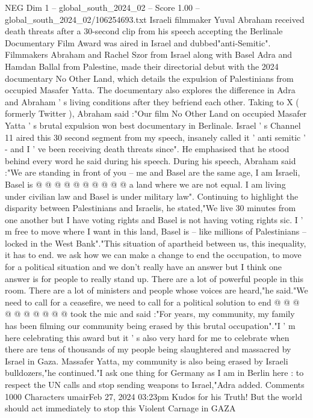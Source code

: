 \begin{textsample}{NEG Dim 1 – global\_south\_2024\_02 – Score 1.00 – global\_south\_2024\_02/106254693.txt}  \label{ex:f1_neg_255}
Israeli filmmaker Yuval Abraham received death threats after a 30-second clip from his speech accepting the Berlinale Documentary Film Award was aired in Israel and dubbed"anti-Semitic".
Filmmakers Abraham and Rachel Szor from Israel along with Basel Adra and Hamdan Ballal from Palestine, made their directorial debut with the 2024 documentary No Other Land, which details the expulsion of Palestinians from occupied Masafer Yatta.
The documentary also explores the difference in Adra and Abraham ' s living conditions after they befriend each other.
Taking to X ( formerly Twitter ), Abraham said :"Our film No Other Land on occupied Masafer Yatta ' s brutal expulsion won best documentary in Berlinale.
Israel ' s Channel 11 aired this 30 second segment from my speech, insanely called it ' anti semitic ' - and I ' ve been receiving death threats since".
He emphasised that he stood behind every word he said during his speech.
During his speech, Abraham said :"We are standing in front of you -- me and Basel are the same age, I am Israeli, Basel is @ @ @ @ @ @ @ @ @ @ a land where we are not equal.
I am living under civilian law and Basel is under military law".
Continuing to highlight the disparity between Palestinians and Israelis, he stated,"We live 30 minutes from one another but I have voting rights and Basel is not having voting rights sic.
I ' m free to move where I want in this land, Basel is -- like millions of Palestinians -- locked in the West Bank"."This situation of apartheid between us, this inequality, it has to end. we ask how we can make a change to end the occupation, to move for a political situation and we don't really have an answer but I think one answer is for people to really stand up.
There are a lot of powerful people in this room.
There are a lot of ministers and people whose voices are heard,"he said."We need to call for a ceasefire, we need to call for a political solution to end @ @ @ @ @ @ @ @ @ @ took the mic and said :"For years, my community, my family has been filming our community being erased by this brutal occupation"."I ' m here celebrating this award but it ' s also very hard for me to celebrate when there are tens of thousands of my people being slaughtered and massacred by Israel in Gaza.
Massafer Yatta, my community is also being erased by Israeli bulldozers,"he continued."I ask one thing for Germany as I am in Berlin here : to respect the UN calls and stop sending weapons to Israel,"Adra added.
Comments 1000 Characters umairFeb 27, 2024 03:23pm Kudos for his Truth!
But the world should act immediately to stop this Violent Carnage in GAZA

\end{textsample}
